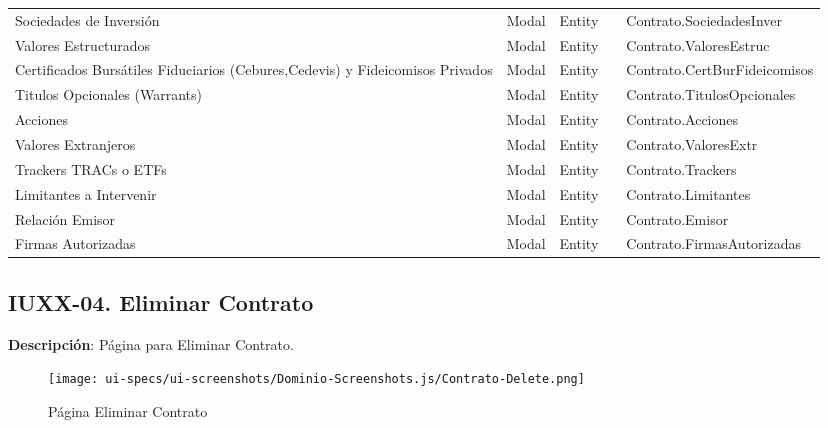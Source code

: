 \begin{table}[H]
{\begin{tabular}{ p{4cm} p{2cm} p{2cm} p{3cm} p{8cm} }
		Sociedades de Inversi\'on &
		Modal &
		Entity &
		 &
		Contrato.SociedadesInver \\
		Valores Estructurados &
		Modal &
		Entity &
		 &
		Contrato.ValoresEstruc \\
		Certificados Burs\'atiles Fiduciarios (Cebures,Cedevis) y Fideicomisos Privados &
		Modal &
		Entity &
		 &
		Contrato.CertBurFideicomisos \\
		Titulos Opcionales (Warrants) &
		Modal &
		Entity &
		 &
		Contrato.TitulosOpcionales \\
		Acciones &
		Modal &
		Entity &
		 &
		Contrato.Acciones \\
		Valores Extranjeros &
		Modal &
		Entity &
		 &
		Contrato.ValoresExtr \\
		Trackers TRACs o ETFs &
		Modal &
		Entity &
		 &
		Contrato.Trackers \\
		Limitantes a Intervenir &
		Modal &
		Entity &
		 &
		Contrato.Limitantes \\
		Relaci\'on Emisor &
		Modal &
		Entity &
		 &
		Contrato.Emisor \\
		Firmas Autorizadas &
		Modal &
		Entity &
		 &
		Contrato.FirmasAutorizadas \\
		\hline
	\end{tabular}
	}
\end{table}

\clearpage
\subsection{IUXX-04. Eliminar Contrato} \label{sec:ui-page-delete-contrato}

\textbf{Descripci\'on}: P\'agina para Eliminar Contrato.\\

\begin{figure}[H]
	\label{tab:ui-delete-contrato-page}
	\texttt{[image: ui-specs/ui-screenshots/Dominio-Screenshots.js/Contrato-Delete.png]}
	\caption{P\'agina Eliminar Contrato}
\end{figure}

